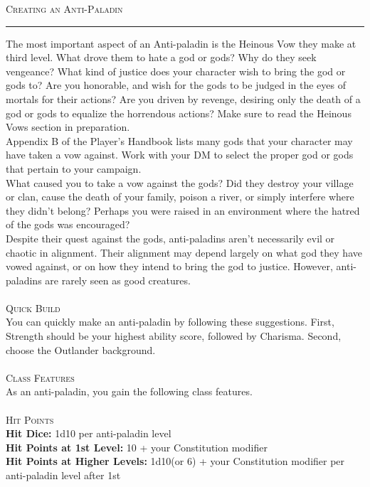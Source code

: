 \documentclass[22pt,a4paper]{article}
\newcommand{\HRule}[2]{\par
  \vspace*{\dimexpr-\parskip-\baselineskip+#2}
  \begingroup
  	\color{sepcol}
  	\noindent\rule{\linewidth}{#1}\par
  \endgroup  
  \vspace*{\dimexpr-\parskip-.5\baselineskip+#2}}
\begin{document}
\begin{multicols*}{2}
{\fontsize{18pt}{18pt}\textcolor{title}{\textsc{Creating an Anti-Paladin}}}
\HRule{1pt}{8pt}
The most important aspect of an Anti-paladin is the Heinous Vow they make at third level. What drove them to hate a god or gods? Why do they seek vengeance? What kind of justice does your character wish to bring the god or gods to? Are you honorable, and wish for the gods to be judged in the eyes of mortals for their actions? Are you driven by revenge, desiring only the death of a god or gods to equalize the horrendous actions? Make sure to read the Heinous Vows section in preparation. \\
\indent Appendix B of the Player’s Handbook lists many gods that your character may have taken a vow against. Work with your DM to select the proper god or gods that pertain to your campaign. \\
\indent What caused you to take a vow against the gods? Did they destroy your village or clan, cause the death of your family, poison a river, or simply interfere where they didn’t belong? Perhaps you were raised in an environment where the hatred of the gods was encouraged? \\
\indent Despite their quest against the gods, anti-paladins aren’t necessarily evil or chaotic in alignment. Their alignment may depend largely on what god they have vowed against, or on how they intend to bring the god to justice. However, anti-paladins are rarely seen as good creatures.\\
\\
{\fontsize{12pt}{12pt}\textcolor{title}{\textsc{Quick Build}}}\\
You can quickly make an anti-paladin by following these suggestions. First, Strength should be your highest ability score, followed by Charisma. Second, choose the Outlander background.\\
\\
{\fontsize{18pt}{18pt}\textcolor{title}{\textsc{Class Features}}}\\
As an anti-paladin, you gain the following class features. \\
\\
{\fontsize{12pt}{12pt}\textcolor{title}{\textsc{Hit Points}}}\\
\textbf{Hit Dice: }1d10 per anti-paladin level\\
\textbf{Hit Points at 1st Level: }10 + your Constitution modifier\\
\textbf{Hit Points at Higher Levels: }1d10(or 6) + your Constitution modifier per anti-paladin level after 1st\\

\end{multicols*}
\end{document}
